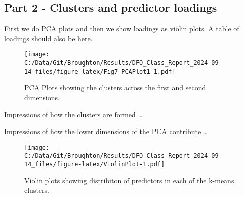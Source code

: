 \documentclass[
  11pt,
]{article}
\begin{document}
\hypertarget{part-2---clusters-and-predictor-loadings}{%
\subsection{Part 2 - Clusters and predictor
loadings}\label{part-2---clusters-and-predictor-loadings}}

First we do PCA plots and then we show loadings as violin plots. A table
of loadings should also be here.

\begin{figure}
\centering
\texttt{[image: C:/Data/Git/Broughton/Results/DFO\_Class\_Report\_2024-09-14\_files/figure-latex/Fig7\_PCAPlot1-1.pdf]}
\caption{PCA Plots showing the clusters across the first and second
dimensions.}
\end{figure}

Impressions of how the clusters are formed \ldots{}

\begin{table}
\centering
\caption{\label{tab:PCATable}Correlation matrix for assessing predictor cross-correlations}
\centering
{}
\end{table}

Impressions of how the lower dimensions of the PCA contribute \ldots{}

\begin{figure}
\centering
\texttt{[image: C:/Data/Git/Broughton/Results/DFO\_Class\_Report\_2024-09-14\_files/figure-latex/ViolinPlot-1.pdf]}
\caption{Violin plots showing distribiton of predictors in each of the
k-means clusters.}
\end{figure}
\end{document}
